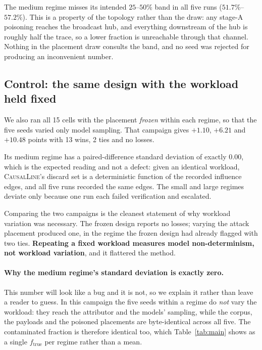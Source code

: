 \documentclass[10pt,twocolumn]{article}
\newcommand{\sys}{\textsc{CausalLine}}
\begin{document}
The medium regime misses its intended $25$--$50\%$ band in all five runs
($51.7\%$--$57.2\%$). This is a property of the topology rather than the draw:
any stage-A poisoning reaches the broadcast hub, and everything downstream of
the hub is roughly half the trace, so a lower fraction is unreachable through
that channel. Nothing in the placement draw consults the band, and no seed was
rejected for producing an inconvenient number.

\subsection{Control: the same design with the workload held fixed}
\label{sec:control}

We also ran all 15 cells with the placement \emph{frozen} within each regime,
so that the five seeds varied only model sampling. That campaign gives
$+1.10$, $+6.21$ and $+10.48$ points with 13 wins, 2 ties and no losses.

Its medium regime has a paired-difference standard deviation of exactly
$0.00$, which is the expected reading and not a defect: given an identical
workload, \sys{}'s discard set is a deterministic function of the recorded
influence edges, and all five runs recorded the same edges. The small and
large regimes deviate only because one run each failed verification and
escalated.

Comparing the two campaigns is the cleanest statement of why workload
variation was necessary. The frozen design reports no losses; varying the
attack placement produced one, in the regime the frozen design had already
flagged with two ties. \textbf{Repeating a fixed workload measures model
non-determinism, not workload variation}, and it flattered the method.

\paragraph{Why the medium regime's standard deviation is exactly zero.}
This number will look like a bug and it is not, so we explain it rather than
leave a reader to guess. In this campaign the five seeds within a regime do
\emph{not} vary the workload: they reach the attributor and the models'
sampling, while the corpus, the payloads and the poisoned placements are
byte-identical across all five. The contaminated fraction is therefore
identical too, which Table~\ref{tab:main} shows as a single $f_{\text{true}}$
per regime rather than a mean.
\end{document}
